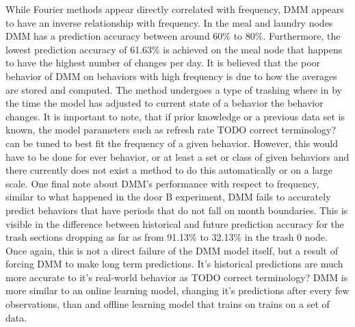 While Fourier methods appear directly correlated with frequency, DMM
appears to have an inverse relationship with frequency. In the meal and
laundry nodes DMM has a prediction accuracy between around 60\% to 80\%.
Furthermore, the lowest prediction accuracy of 61.63\% is achieved on the meal
node that happens to have the highest number of changes per day. It is believed
that the poor behavior of DMM on behaviors with high frequency is due to
how the averages are stored and computed. The method undergoes a type of
trashing where in by the time the model has adjusted to current state of a
behavior the behavior changes. It is important to note, that if prior knowledge
or a previous data set is known, the model parameters such as refresh rate TODO
correct terminology? can be tuned to best fit the frequency of a given behavior.
However, this would have to be done for ever behavior, or at least a set or class
of given behaviors and there currently does not exist a method to do this
automatically or on a large scale. One final note about DMM's performance
with respect to frequency, similar to what happened in the door B experiment,
DMM fails to accurately predict behaviors that have periods that do not
fall on month boundaries. This is visible in the difference between historical
and future prediction accuracy for the trash sections dropping as far as from
91.13\% to 32.13\% in the trash 0 node. Once again, this is not a direct failure
of the DMM model itself, but a result of forcing DMM to make long
term predictions. It's historical predictions are much more accurate to it's
real-world behavior as TODO correct terminology? DMM is more similar to
an online learning model, changing it's predictions after every few observations,
than and offline learning model that trains on trains on a set of data. \\




\begin{table}[htb!]
  \centering
  \caption{Hallway Delivery Section}
\end{table}

